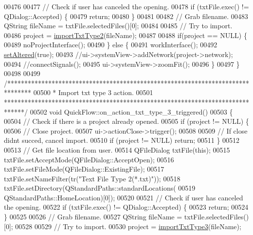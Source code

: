 \begin{DoxyCode}
00476 
00477   \textcolor{comment}{// Check if user has canceled the opening.}
00478   \textcolor{keywordflow}{if} (txtFile.exec() != QDialog::Accepted) \{
00479     \textcolor{keywordflow}{return};
00480   \}
00481 
00482   \textcolor{comment}{// Grab filename.}
00483   QString fileName = txtFile.selectedFiles()[0];
00484 
00485   \textcolor{comment}{// Try to import.}
00486   project = \hyperlink{import_8cpp_a05a39d4117f6721dc4bbdd7d45bcdd45}{importTxtType2}(fileName);
00487 
00488   \textcolor{keywordflow}{if}(project == NULL) \{
00489     noProjectInterface();
00490   \} \textcolor{keywordflow}{else} \{
00491     workInterface();
00492     \hyperlink{group___window_ga4b63ea5ca52a9eea14db0a22b5a133f8}{setAltered}(\textcolor{keyword}{true});
00493     \textcolor{comment}{//ui->systemView->addNetwork(project->network);}
00494     \textcolor{comment}{//connectSignals();}
00495     ui->systemView->zoomFit();
00496   \}
00497 \}
00498 
00499 \textcolor{comment}{/*******************************************************************************}
00500 \textcolor{comment}{ * Import txt type 3 action.}
00501 \textcolor{comment}{ ******************************************************************************/}
00502 \textcolor{keywordtype}{void} QuickFlow::on\_action\_txt\_type\_3\_triggered()
00503 \{
00504   \textcolor{comment}{// Check if there is a project already opened.}
00505   \textcolor{keywordflow}{if} (project != NULL) \{
00506     \textcolor{comment}{// Close project.}
00507     ui->actionClose->trigger();
00508 
00509     \textcolor{comment}{// If close didnt succed, cancel import.}
00510     \textcolor{keywordflow}{if} (project != NULL) \textcolor{keywordflow}{return};
00511   \}
00512 
00513   \textcolor{comment}{// Get file location from user.}
00514   QFileDialog txtFile(\textcolor{keyword}{this});
00515   txtFile.setAcceptMode(QFileDialog::AcceptOpen);
00516   txtFile.setFileMode(QFileDialog::ExistingFile);
00517   txtFile.setNameFilter(tr(\textcolor{stringliteral}{"Text File Type 2(*.txt)"}));
00518   txtFile.setDirectory(QStandardPaths::standardLocations(
00519                          QStandardPaths::HomeLocation)[0]);
00520 
00521   \textcolor{comment}{// Check if user has canceled the opening.}
00522   \textcolor{keywordflow}{if} (txtFile.exec() != QDialog::Accepted) \{
00523     \textcolor{keywordflow}{return};
00524   \}
00525 
00526   \textcolor{comment}{// Grab filename.}
00527   QString fileName = txtFile.selectedFiles()[0];
00528 
00529   \textcolor{comment}{// Try to import.}
00530   project = \hyperlink{import_8cpp_ac1810dcefba801e18ee9900ed6c0ff82}{importTxtType3}(fileName);

\end{DoxyCode}
